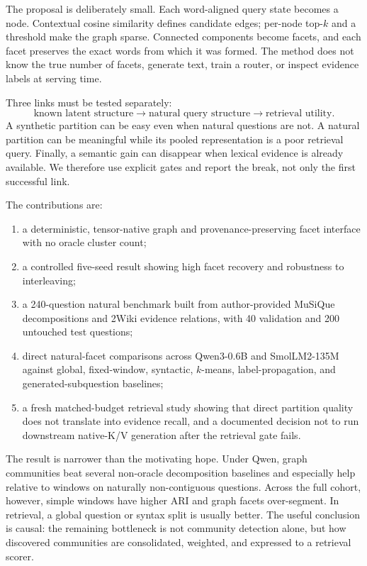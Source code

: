 \documentclass[11pt]{article}
\begin{document}
The proposal is deliberately small. Each word-aligned query state becomes a node. Contextual cosine similarity defines candidate edges; per-node top-$k$ and a threshold make the graph sparse. Connected components become facets, and each facet preserves the exact words from which it was formed. The method does not know the true number of facets, generate text, train a router, or inspect evidence labels at serving time.

Three links must be tested separately:
\begin{equation}
\text{known latent structure}\rightarrow\text{natural query structure}\rightarrow\text{retrieval utility}.
\end{equation}
A synthetic partition can be easy even when natural questions are not. A natural partition can be meaningful while its pooled representation is a poor retrieval query. Finally, a semantic gain can disappear when lexical evidence is already available. We therefore use explicit gates and report the break, not only the first successful link.

The contributions are:
\begin{enumerate}[leftmargin=*]
  \item a deterministic, tensor-native graph and provenance-preserving facet interface with no oracle cluster count;
  \item a controlled five-seed result showing high facet recovery and robustness to interleaving;
  \item a 240-question natural benchmark built from author-provided MuSiQue decompositions and 2Wiki evidence relations, with 40 validation and 200 untouched test questions;
  \item direct natural-facet comparisons across Qwen3-0.6B and SmolLM2-135M against global, fixed-window, syntactic, $k$-means, label-propagation, and generated-subquestion baselines;
  \item a fresh matched-budget retrieval study showing that direct partition quality does not translate into evidence recall, and a documented decision not to run downstream native-K/V generation after the retrieval gate fails.
\end{enumerate}

The result is narrower than the motivating hope. Under Qwen, graph communities beat several non-oracle decomposition baselines and especially help relative to windows on naturally non-contiguous questions. Across the full cohort, however, simple windows have higher ARI and graph facets over-segment. In retrieval, a global question or syntax split is usually better. The useful conclusion is causal: the remaining bottleneck is not community detection alone, but how discovered communities are consolidated, weighted, and expressed to a retrieval scorer.
\end{document}
